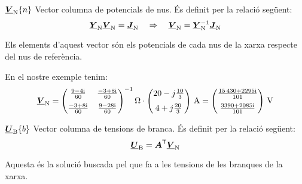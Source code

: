 \begin{list}{}
   \item[$\underline{\boldsymbol{V}}_\mathrm{N}\{n\}$] Vector columna de potencials de nus. És definit per la relació següent:
   \begin{equation}
      \underline{\boldsymbol{Y}}_\mathrm{N} \underline{\boldsymbol{V}}_\mathrm{N} = \underline{\boldsymbol{J}}_\mathrm{N} \quad\Rightarrow\quad
      \underline{\boldsymbol{V}}_\mathrm{N} = \underline{\boldsymbol{Y}}_\mathrm{N}^{-1} \underline{\boldsymbol{J}}_\mathrm{N} \label{eq:vn}
   \end{equation}

   Els elements d'aquest vector són els potencials de cada nus de la xarxa respecte del nus de referència.

   En el nostre exemple tenim:
   \[
      \mcmplx{V}\ped{N} =
      \begin{pmatrix}
            \frac{\complexnum{ 9 - j 4}}{60} & \frac{\complexnum{-3 + j 8}}{60} \\[2mm]
            \frac{\complexnum{-3 + j 8}}{60} & \frac{\complexnum{9 - j 28}}{60}
      \end{pmatrix} ^{-1}\unit{\ohm} \cdot
      \begin{pmatrix}
            20 - j \frac{10}{3} \\[2mm]
            4 + j \frac{20}{3}
      \end{pmatrix}\,\unit{A}
      =
      \begin{pmatrix}
            \frac{\complexnum{15430 + j 2295}}{101} \\[2mm]
            \frac{\complexnum{3390 + j 2085}}{101}
      \end{pmatrix}\,\unit{V}
      \label{eq:vn_exemp}
   \]

   \item[$\underline{\boldsymbol{U}}_\mathrm{B}\{b\}$] Vector columna de tensions de branca. És definit per la relació següent:
   \begin{equation}
      \underline{\boldsymbol{U}}_\mathrm{B} = \boldsymbol{A}^\mathrm{\textsf{T}} \underline{\boldsymbol{V}}_\mathrm{N} \label{eq:ur}
   \end{equation}

   Aquesta és la solució buscada pel que fa a les tensions de les branques de la xarxa.


\end{list}
